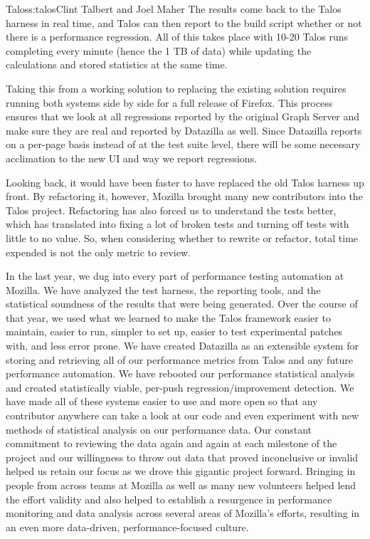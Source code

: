 \begin{aosachapter}{Talos}{s:talos}{Clint Talbert and Joel Maher}
The results come back to the Talos harness in real time, and Talos can
then report to the build script whether or not there is a performance
regression. All of this takes place with 10-20 Talos runs completing
every minute (hence the 1 TB of data) while updating the calculations
and stored statistics at the same time.

Taking this from a working solution to replacing the existing solution
requires running both systems side by side for a full release of
Firefox. This process ensures that we look at all regressions reported
by the original Graph Server and make sure they are real and reported by
Datazilla as well. Since Datazilla reports on a per-page basis instead
of at the test suite level, there will be some necessary acclimation to
the new UI and way we report regressions.

Looking back, it would have been faster to have replaced the old Talos
harness up front. By refactoring it, however, Mozilla brought many new
contributors into the Talos project. Refactoring has also forced us to
understand the tests better, which has translated into fixing a lot of
broken tests and turning off tests with little to no value. So, when
considering whether to rewrite or refactor, total time expended is not
the only metric to review.


In the last year, we dug into every part of performance testing
automation at Mozilla. We have analyzed the test harness, the reporting
tools, and the statistical soundness of the results that were being
generated. Over the course of that year, we used what we learned to make
the Talos framework easier to maintain, easier to run, simpler to set
up, easier to test experimental patches with, and less error prone. We
have created Datazilla as an extensible system for storing and
retrieving all of our performance metrics from Talos and any future
performance automation. We have rebooted our performance statistical
analysis and created statistically viable, per-push
regression/improvement detection. We have made all of these systems
easier to use and more open so that any contributor anywhere can take a
look at our code and even experiment with new methods of statistical
analysis on our performance data. Our constant commitment to reviewing
the data again and again at each milestone of the project and our
willingness to throw out data that proved inconclusive or invalid helped
us retain our focus as we drove this gigantic project forward. Bringing
in people from across teams at Mozilla as well as many new volunteers
helped lend the effort validity and also helped to establish a
resurgence in performance monitoring and data analysis across several
areas of Mozilla's efforts, resulting in an even more data-driven,
performance-focused culture.

\end{aosachapter}
